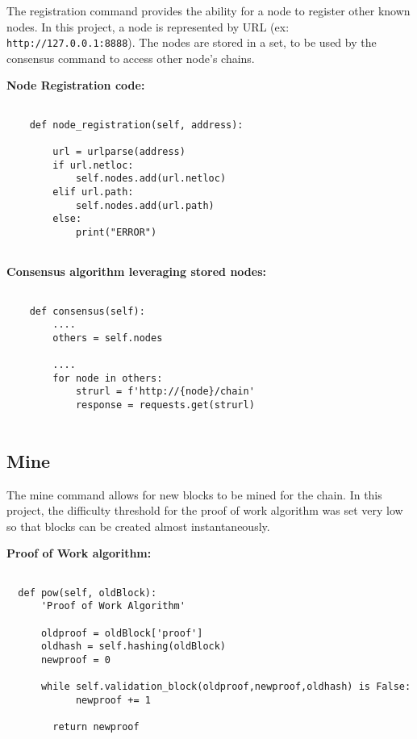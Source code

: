 The registration command provides the ability for a node to register
other known nodes. In this project, a node is represented by
URL (ex: \verb|http://127.0.0.1:8888|). The nodes are stored in a set, to be
used by the consensus command to access other node's chains.

\bigskip
\noindent
\textbf{Node Registration code:}
\begin{footnotesize}
\begin{verbatim}

    def node_registration(self, address):

        url = urlparse(address)
        if url.netloc:
            self.nodes.add(url.netloc)
        elif url.path:
            self.nodes.add(url.path)
        else:
            print("ERROR")
        
\end{verbatim}
\end{footnotesize}


\bigskip
\noindent
\textbf{Consensus algorithm leveraging stored nodes:}
\begin{footnotesize}
\begin{verbatim}

    def consensus(self):
        ....
        others = self.nodes
        
        ....
        for node in others:
            strurl = f'http://{node}/chain'
            response = requests.get(strurl)
        
\end{verbatim}
\end{footnotesize}

\subsection{Mine}

The mine command allows for new blocks to be mined for the chain. In
this project, the difficulty threshold for the proof of work algorithm
was set very low so that blocks can be created almost instantaneously.

\bigskip
\noindent
\textbf{Proof of Work algorithm:}
\begin{footnotesize}
\begin{verbatim}

  def pow(self, oldBlock):
      'Proof of Work Algorithm'

      oldproof = oldBlock['proof']
      oldhash = self.hashing(oldBlock)
      newproof = 0

      while self.validation_block(oldproof,newproof,oldhash) is False:
            newproof += 1

        return newproof
        
\end{verbatim}
\end{footnotesize}

